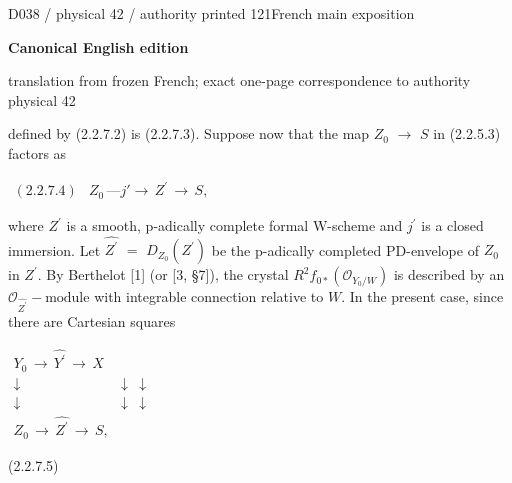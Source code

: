 \documentclass[9pt]{article}
\newcommand{\CanonText}[1]{\par{\fontsize{8.0}{9.35}\selectfont\RaggedRight #1\par}\vspace{2.2pt}}
\newenvironment{CanonMathBlock}{\par\vspace{1.2pt}\begin{center}\fontsize{6.8}{8.0}\selectfont\(\displaystyle}{\)\end{center}\vspace{1.2pt}}
\newcommand{\LayerTitle}{Canonical English edition}
\begin{document}
\newpage
\noindent\begin{minipage}[t][\dimexpr\textheight-5pt\relax][t]{\textwidth}
{\sffamily\fontsize{7.3}{8.2}\selectfont\color{Quiet} D038 / physical 42 / authority printed 121\hfill French main exposition}
\par{}\vspace{4.5pt}
{\sffamily\fontsize{10.4}{11.6}\selectfont\bfseries\color{Accent} \LayerTitle}
\par{\sffamily\fontsize{6.7}{7.7}\selectfont\color{Quiet} translation from frozen French; exact one-page correspondence to authority physical 42}
\vspace{5pt}
\CanonText{defined by (2.2.7.2) is (2.2.7.3). Suppose now that the map \(Z_{0}\) \(\to{}\) \(S\) in (2.2.5.3) factors as}
\begin{CanonMathBlock}
\begin{array}{cc}
(2.2.7.4) & Z_{0}\,\text{---}j'\to{}\,Z^{\prime}\,\to{}\,S,
\end{array}
\end{CanonMathBlock}
\CanonText{where \(Z^{\prime}\) is a smooth, p-adically complete formal W-scheme and \(j^{\prime}\) is a closed immersion. Let \(\widehat{Z^{\prime}}\) \(=\) \(D_{Z_{0}}(Z^{\prime})\) be the p-adically completed PD-envelope of \(Z_{0}\) in \(Z^{\prime}\). By Berthelot [1] (or [3, §7]), the crystal \(R^{2}f_{0*}(\mathcal{O}_{Y_{0}/W})\) is described by an \(\mathcal{O}_{\widehat{Z^{\prime}}}-\text{module}\) with integrable connection relative to \(W\). In the present case, since there are Cartesian squares}
\begin{CanonMathBlock}
\begin{array}{ccc}
Y_{0}\,\longrightarrow{}\,\widehat{Y^{\prime}}\,\longrightarrow{}\,X & {} & {}\\
\downarrow{} & \downarrow{} & \downarrow{}\\
\downarrow{} & \downarrow{} & \downarrow{}\\
Z_{0}\,\longrightarrow{}\,\widehat{Z^{\prime}}\,\longrightarrow{}\,S, & {} & {}
\end{array}
\end{CanonMathBlock}
\CanonText{(2.2.7.5)}

\end{minipage}
\end{document}
